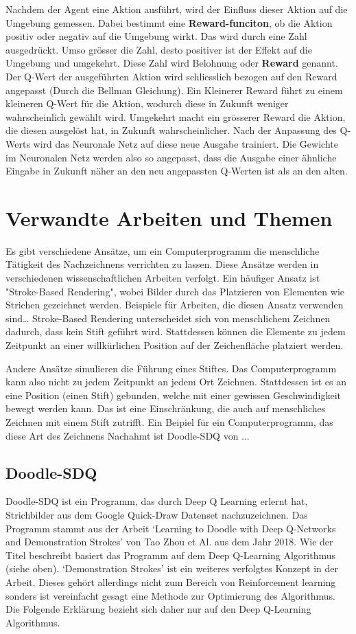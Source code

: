 Nachdem der Agent eine Aktion ausführt, wird der Einfluss dieser Aktion auf die
Umgebung gemessen. Dabei bestimmt eine \textbf{Reward-funciton}, ob die Aktion
positiv oder negativ auf die Umgebung wirkt. Das wird durch eine Zahl
ausgedrückt. Umso grösser die Zahl, desto positiver ist der Effekt auf die
Umgebung und umgekehrt. Diese Zahl wird Belohnung oder \textbf{Reward} genannt.
Der Q-Wert der ausgeführten Aktion wird schliesslich bezogen auf den Reward
angepasst (Durch die Bellman Gleichung). Ein Kleinerer Reward führt zu einem
kleineren Q-Wert für die Aktion, wodurch diese in Zukunft weniger wahrscheinlich
gewählt wird. Umgekehrt macht ein grösserer Reward die Aktion, die diesen
ausgelöst hat, in Zukunft wahrscheinlicher. Nach der Anpassung des Q-Werts wird
das Neuronale Netz auf diese neue Ausgabe trainiert. Die Gewichte im Neuronalen
Netz werden also so angepasst, dass die Ausgabe einer ähnliche Eingabe in
Zukunft näher an den neu angepassten Q-Werten ist als an den alten.





\section{Verwandte Arbeiten und Themen}
\label{chap:t_verwandt}
Es gibt verschiedene Ansätze, um ein Computerprogramm die menschliche Tätigkeit
des Nachzeichnens verrichten zu lassen. Diese Ansätze werden in verschiedenen
wissenschaftlichen Arbeiten verfolgt. Ein häufiger Ansatz ist "Stroke-Based
Rendering", wobei Bilder durch das Platzieren von Elementen wie Strichen
gezeichnet werden. Beispiele für Arbeiten, die diesen Ansatz verwenden sind\dots
Stroke-Based Rendering unterscheidet sich von menschlichem Zeichnen dadurch,
dass kein Stift geführt wird. Stattdessen können die Elemente zu jedem Zeitpunkt
an einer willkürlichen Position auf der Zeichenfläche platziert werden.

Andere Ansätze simulieren die Führung eines Stiftes. Das Computerprogramm kann
also nicht zu jedem Zeitpunkt an jedem Ort Zeichnen. Stattdessen ist es an eine
Position (einen Stift) gebunden, welche mit einer gewissen Geschwindigkeit
bewegt werden kann. Das ist eine Einschränkung, die auch auf menschliches
Zeichnen mit einem Stift zutrifft. Ein Beipiel für ein Computerprogramm, das diese Art des Zeichnens Nachahmt ist
Doodle-SDQ von ...


\subsection*{Doodle-SDQ}
Doodle-SDQ ist ein Programm, das durch Deep Q Learning erlernt hat, Strichbilder
aus dem Google Quick-Draw Datenset nachzuzeichnen. Das Programm stammt aus der
Arbeit `Learning to Doodle with Deep Q-Networks and Demonstration Strokes' von
Tao Zhou et Al. aus dem Jahr 2018. Wie der Titel beschreibt basiert das Programm
auf dem Deep Q-Learning Algorithmus (siehe oben). `Demonstration Strokes' ist
ein weiteres verfolgtes Konzept in der Arbeit. Dieses gehört allerdings nicht
zum Bereich von Reinforcement learning sonders ist vereinfacht gesagt eine
Methode zur Optimierung des Algorithmus. Die Folgende Erklärung bezieht sich
daher nur auf den Deep Q-Learning Algorithmus.

